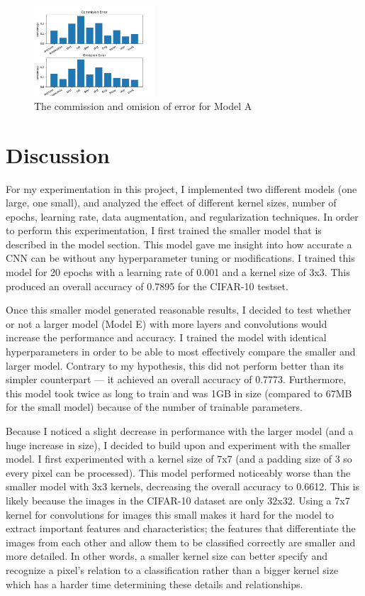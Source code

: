\documentclass[11pt,a4paper]{article}
\begin{document}
\begin{figure}
  \centering
  \includegraphics[width=0.40\textwidth]{figures/commission_omision.png}
  \caption{The commission and omision of error for Model A}
  \label{fig:commission_omision}
\end{figure}



\section{Discussion}

For my experimentation in this project, I implemented two different models (one large, one small),
 and analyzed the effect of different kernel sizes, number of epochs, learning rate, data augmentation, and regularization techniques. 
 In order to perform this experimentation, I first trained the smaller model that is described in the model section. 
 This model gave me insight into how accurate a CNN can be without any hyperparameter tuning or modifications. 
 I trained this model for 20 epochs with a learning rate of 0.001 and a kernel size of 3x3. This produced an overall 
 accuracy of 0.7895 for the CIFAR-10 testset. 

Once this smaller model generated reasonable results, I decided to test whether or not a larger model (Model E) with 
 more layers and convolutions would increase the performance and accuracy. I trained the model with identical hyperparameters
  in order to be able to most effectively compare the smaller and larger model. Contrary to my hypothesis, this did not perform
   better than its simpler counterpart --- it achieved an overall accuracy of 0.7773. Furthermore, this model took twice as long
    to train and was 1GB in size (compared to 67MB for the small model) because of the number of trainable parameters. 

Because I noticed a slight decrease in performance with the larger model (and a huge increase in size), I decided to build upon and experiment
 with the smaller model. I first experimented with a kernel size of 7x7 (and a padding size of 3 so every pixel can be processed).
  This model performed noticeably worse than the smaller model with 3x3 kernels, decreasing the overall accuracy to 0.6612.
   This is likely because the images in the CIFAR-10 dataset are only 32x32. Using a 7x7 kernel for convolutions for images this 
   small makes it hard for the model to extract important features and characteristics; the features that differentiate the images
    from each other and allow them to be classified correctly are smaller and more detailed. In other words, a smaller kernel size 
    can better specify and recognize a pixel's relation to a classification rather than a bigger kernel size which has a harder 
    time determining these details and relationships.
\end{document}
